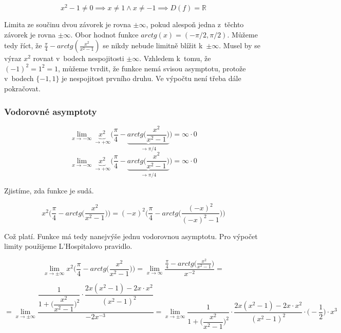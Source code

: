 \begin{displaymath}
x^2-1 \neq 0 \implies x \neq 1 \wedge x \neq -1 \implies D(f) = \mathbb{R}
\end{displaymath}

Limita ze součinu dvou závorek je rovna $ \pm \infty$, pokud alespoň jedna z~těchto závorek je rovna $\pm \infty$. Obor hodnot funkce $arctg(x) = (-\pi/2,\pi/2)$. Můžeme tedy říct, že $\frac{\pi}{4}-arctg(\frac{x^2}{x^2-1})$ se nikdy nebude limitně blížit k~$\pm \infty$. Musel by se výraz $x^2$ rovnat v~bodech nespojitosti $\pm \infty$. Vzhledem k~tomu, že $(-1)^2 = 1^2 = 1$, můžeme tvrdit, že funkce nemá svisou asymptotu, protože v~bodech $\{-1,1\}$ je nespojitost prvního druhu. Ve výpočtu není třeba dále pokračovat.

\subsubsection{Vodorovné asymptoty}

\begin{displaymath}
\lim_{x \to - \infty}\underbrace{x^2}_{\rightarrow+\infty}\Big(\frac{\pi}{4}-\underbrace{arctg\Big(\frac{x^2}{x^2-1}\Big)}_{\rightarrow \pi/4}\Big) = \infty \cdot 0
\end{displaymath}
\begin{displaymath}
\lim_{x \to - \infty}\underbrace{x^2}_{\rightarrow+\infty}\Big(\frac{\pi}{4}-\underbrace{arctg\Big(\frac{x^2}{x^2-1}\Big)}_{\rightarrow \pi/4}\Big) = \infty \cdot 0
\end{displaymath}

Zjistíme, zda funkce je sudá.

\begin{displaymath}
x^2\Big(\frac{\pi}{4}-arctg\Big(\frac{x^2}{x^2-1}\Big)\Big) = 
(-x)^2\Big(\frac{\pi}{4}-arctg\Big(\frac{(-x)^2}{(-x)^2-1}\Big)\Big)
\end{displaymath}

Což platí. Funkce má tedy nanejvýše jednu vodorovnou asymptotu. Pro výpočet limity použijeme L'Hospitalovo pravidlo.

\begin{displaymath}
\lim_{x \to \pm \infty}x^2\Big(\frac{\pi}{4}-arctg\Big(\frac{x^2}{x^2-1}\Big)\Big) = \lim_{x \to \infty}\frac{\frac{\pi}{4}-arctg\Big(\frac{x^2}{x^2-1}\Big)}{x^{-2}} =
\end{displaymath}

\begin{displaymath}
= \lim_{x \to \pm \infty} \dfrac{\dfrac{1}{1+\Big(\dfrac{x^2}{x^2-1}\Big)^2}\cdot\dfrac{2x(x^2-1)-2x\cdot x^2}{(x^2-1)^2}}{-2x^{-3}} = \lim_{x \to \pm \infty}\dfrac{1}{1+\Big(\dfrac{x^2}{x^2-1}\Big)^2}\cdot\dfrac{2x(x^2-1)-2x\cdot x^2}{(x^2-1)^2} \cdot \Big(-\dfrac{1}{2}\Big) \cdot x^3
\end{displaymath}

